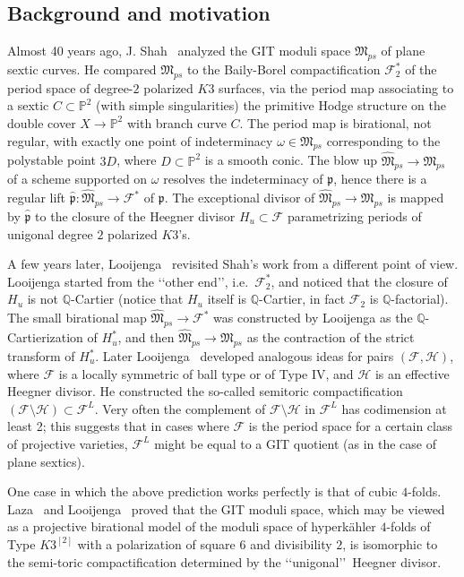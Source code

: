 \documentclass[11pt]{amsart}
\numberwithin{equation}{section}
\theoremstyle{plain}
\theoremstyle{remark}
\theoremstyle{definition}
\newcommand{\sF}{\mathscr{F}}
\newcommand{\gp}{\mathfrak{p}}
\newcommand{\sH}{\mathscr{H}}
\newcommand{\gM}{\mathfrak{M}}
\newcommand{\PP}{{\mathbb P}}
\newcommand{\QQ}{{\mathbb Q}}
\newcommand{\wh}{\widehat}
\begin{document}
\subsection{Background and motivation}
%
Almost 40 years ago, J. Shah~\cite{shah} analyzed the GIT moduli space $\gM_{ps}$ of plane sextic curves. He compared $\gM_{ps}$ to the Baily-Borel compactification $\sF_2^{*}$ of the period space of degree-$2$ polarized $K3$ surfaces, via the period map associating to a sextic $C\subset\PP^2$ (with simple singularities) the primitive Hodge structure on the double cover $X\to\PP^2$ with branch curve $C$. The period map is birational, not regular, with exactly one point of indeterminacy $\omega\in\gM_{ps}$ corresponding to the polystable point $3D$, where  $D\subset\PP^2$ is a smooth conic. The blow up $\wh{\gM}_{ps}\to\gM_{ps}$ of a scheme supported on $\omega$ resolves the indeterminacy of $\gp$, hence there is a regular lift 
$\wh{\gp}\colon \wh{\gM}_{ps}\to\sF^{*}$ of $\gp$. The exceptional divisor of $\wh{\gM}_{ps}\to\gM_{ps}$ is mapped by $\wh{\gp}$ to the closure of the Heegner divisor $H_u\subset\sF$ parametrizing periods of unigonal degree $2$ polarized $K3$'s.

A few years later, Looijenga~\cite{looijengavancouver} revisited Shah's work from a different point of view. Looijenga started from the \lq\lq other end\rq\rq, i.e.~$\sF_2^{*}$, and noticed that the closure of $H_u$ is not $\QQ$-Cartier (notice that $H_u$ itself is $\QQ$-Cartier, in fact $\sF_2$ is $\QQ$-factorial). 
The small birational map $ \wh{\gM}_{ps}\to\sF^{*}$ was constructed by Looijenga as the $\QQ$-Cartierization of $H_u^{*}$, and then 
 $\wh{\gM}_{ps}\to\gM_{ps}$ as the contraction of the strict transform of $H^{*}_u$. Later Looijenga~\cite{looijenga1,looijengacompact} developed analogous ideas for pairs $(\sF,\sH)$, where $\sF$ is a locally symmetric of ball type or of Type IV, and $\sH$ is an effective  Heegner divisor. He constructed the so-called semitoric compactification $(\sF\setminus\sH)\subset\sF^L$. Very often the complement of  $\sF\setminus\sH$ in 
 $\sF^L$ has codimension at least 2; this suggests that in cases where $\sF$ is the period space for a certain class of projective varieties, 
 $\sF^L$ might be equal to a GIT quotient (as in the case of plane sextics). 
 
 One case in which the above prediction works perfectly is that of cubic $4$-folds. Laza~\cite{gitcubic,cubic4fold} and Looijenga~\cite{lcubic} proved that the GIT moduli space, which may be viewed as a projective birational model of the moduli space of hyperk\"ahler $4$-folds of Type $K3^{[2]}$ with a polarization of square $6$ and divisibility $2$, is isomorphic to the semi-toric compactification determined by the \lq\lq unigonal\rq\rq\ Heegner divisor. 
 
\end{document}
